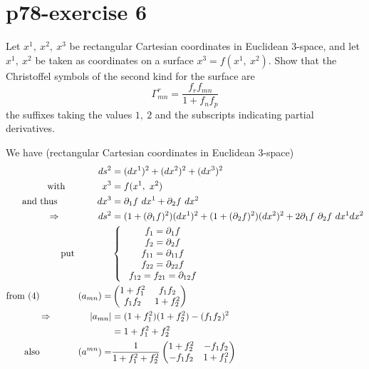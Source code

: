 \section{p78-exercise 6}
\begin{tcolorbox}
Let $x^1, \ x^2,\ x^3$ be rectangular Cartesian coordinates in Euclidean 3-space, and let $x^1, \ x^2$ be taken as coordinates on a surface $x^3 = f(x^1, \ x^2)$. Show that the Christoffel symbols of the second kind for the surface are $$ \Gamma^r_{mn} = \frac{f_r f_{mn}}{1+ f_n f_p}$$ the suffixes taking the values $1, \ 2$ and the subscripts indicating partial derivatives.
\end{tcolorbox}
We have (rectangular Cartesian coordinates in Euclidean 3-space)
\begin{align}
\ ds^2 &= (dx^1)^2 + (dx^2)^2+(dx^3)^2\\
\text{with} \quad\quad\quad\quad x^3 &= f(x^1, \ x^2)\\
\text{and thus } \quad\quad\quad\quad dx^3 &= \partial_1 f \ dx^1 + \partial_2 f \  dx^2\\
\Rightarrow \quad\quad\quad\quad ds^2 &= (1+ (\partial_1 f)^2) (dx^1)^2 + (1+ (\partial_2 f)^2) (dx^2)^2+ 2\partial_1 f \ \partial_2 f \ dx^1 dx^2\\
\text{put}\quad\quad\quad\quad & \left \{ \begin{array}{c}
\ f_1 = \partial_1 f\\
\ f_2 = \partial_2 f\\
\ f_{11} = \partial_{11} f\\
\ f_{22} = \partial_{22} f\\
\ f_{12} = f_{21 } = \partial_{12} f\\
\end{array}\right.\\
\text{from (4)}\quad\quad\quad\quad \left(a_{mn}\right) =& \begin{pmatrix}
 1+f_1 ^2& f_1f_2 \\
 f_1f_2& 1+f_2 ^2 \\
\end{pmatrix}\\
\Rightarrow\quad\quad\quad\quad \left|a_{mn}\right| &= (1+f_1 ^2)(1+f_2 ^2) - (f_1f_2)^2\\
\ & = 1 + f_1 ^2+f_2 ^2\\
\text{also} \quad\quad\quad\quad \left(a^{mn}\right) =& \frac{1}{1 + f_1 ^2+f_2 ^2}\begin{pmatrix}
 1+f_2 ^2& -f_1f_2 \\
 -f_1f_2& 1+f_1 ^2 \\
\end{pmatrix}
\end{align}
